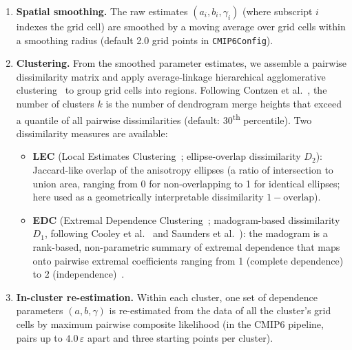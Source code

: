 \documentclass[preprint,12pt,a4paper]{elsarticle}
\begin{document}
\begin{enumerate}
  parameters of the extremal-$t$ dependence model of Contzen
  et al.~\cite{contzen2025,opitz2013}: the semi-minor axis length $a$
  of the anisotropy ellipse, the difference $b \ge 0$ between its
  semi-major and semi-minor axis lengths, and the rotation angle $\gamma$ of the
  semi-major axis. They are estimated by
  maximising a pairwise composite likelihood~\cite{padoan2010,contzen2025}. The
  optimisation runs over all neighbouring pairs within grid-point
  distance $\varepsilon$ (default $\varepsilon=5$ in \texttt{CMIP6Config}).
  The likelihood is maximised with the bounded quasi-Newton method
  L-BFGS-B from SciPy, started from 50 Latin-hypercube points
  (seed = 42).
\item \textbf{Spatial smoothing.}
  The raw estimates $(a_i, b_i, \gamma_i)$ (where
  subscript $i$ indexes the grid cell) are smoothed by a
  moving average over grid cells within a smoothing radius (default
  2.0 grid points in \texttt{CMIP6Config}).
\item \textbf{Clustering.}
  From the smoothed parameter estimates, we assemble a pairwise
  dissimilarity matrix and apply average-linkage hierarchical
  agglomerative clustering~\cite{contzen2025} to group grid cells into regions.
  Following Contzen et al.~\cite{contzen2025}, the number of
  clusters $k$ is the number of dendrogram merge heights that exceed
  a quantile of all pairwise dissimilarities (default:
  30\textsuperscript{th} percentile).
  Two dissimilarity measures are available:
  \begin{itemize}
  \item \textbf{LEC} (Local Estimates Clustering~\cite{contzen2025}; ellipse-overlap
    dissimilarity $D_2$): Jaccard-like overlap of the anisotropy
    ellipses (a ratio of intersection to union area, ranging
    from 0 for non-overlapping to 1 for identical ellipses; here
    used as a geometrically interpretable dissimilarity $1 - \text{overlap}$).
  \item \textbf{EDC} (Extremal Dependence Clustering~\cite{contzen2025}; madogram-based
    dissimilarity $D_1$, following Cooley et al.~\cite{cooley2006} and Saunders et al.~\cite{saunders2021}):
    the madogram is a rank-based, non-parametric summary of
    extremal dependence that maps onto pairwise extremal coefficients
    ranging from 1 (complete dependence) to 2
    (independence)~\cite{cooley2006}.
  \end{itemize}
\item \textbf{In-cluster re-estimation.}
  Within each cluster, one set of dependence parameters
  $(a,b,\gamma)$ is re-estimated from the data of all the cluster's
  grid cells by maximum pairwise composite likelihood (in the CMIP6
  pipeline, pairs up to $4.0\,\varepsilon$ apart and three starting
  points per cluster).
\end{enumerate}
\end{document}
